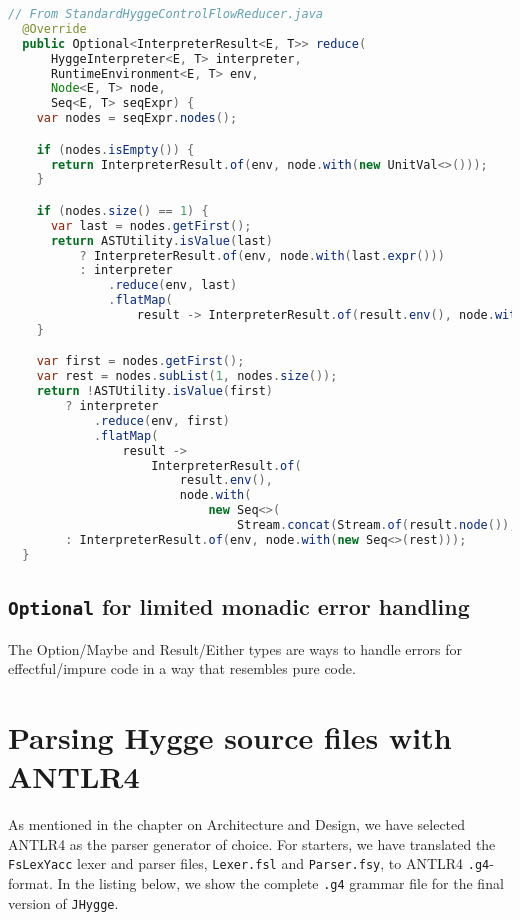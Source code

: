 \begin{lstlisting}[language=Java]
  // From StandardHyggeControlFlowReducer.java
  @Override
  public Optional<InterpreterResult<E, T>> reduce(
      HyggeInterpreter<E, T> interpreter,
      RuntimeEnvironment<E, T> env,
      Node<E, T> node,
      Seq<E, T> seqExpr) {
    var nodes = seqExpr.nodes();

    if (nodes.isEmpty()) {
      return InterpreterResult.of(env, node.with(new UnitVal<>()));
    }

    if (nodes.size() == 1) {
      var last = nodes.getFirst();
      return ASTUtility.isValue(last)
          ? InterpreterResult.of(env, node.with(last.expr()))
          : interpreter
              .reduce(env, last)
              .flatMap(
                  result -> InterpreterResult.of(result.env(), node.with(result.node().expr())));
    }

    var first = nodes.getFirst();
    var rest = nodes.subList(1, nodes.size());
    return !ASTUtility.isValue(first)
        ? interpreter
            .reduce(env, first)
            .flatMap(
                result ->
                    InterpreterResult.of(
                        result.env(),
                        node.with(
                            new Seq<>(
                                Stream.concat(Stream.of(result.node()), rest.stream()).toList()))))
        : InterpreterResult.of(env, node.with(new Seq<>(rest)));
  }
\end{lstlisting}

\subsection{\texttt{Optional} for limited monadic error handling}

The Option/Maybe and Result/Either types are ways to handle errors for effectful/impure code in a way that resembles pure code.

\section{Parsing Hygge source files with ANTLR4}

As mentioned in the chapter on Architecture and Design, we have selected ANTLR4 as the parser generator of choice. For starters,
we have translated the \texttt{FsLexYacc} lexer and parser files, \texttt{Lexer.fsl} and \texttt{Parser.fsy}, to ANTLR4
\texttt{.g4}-format. In the listing below, we show the complete \texttt{.g4} grammar file for the final version of \texttt{JHygge}.

